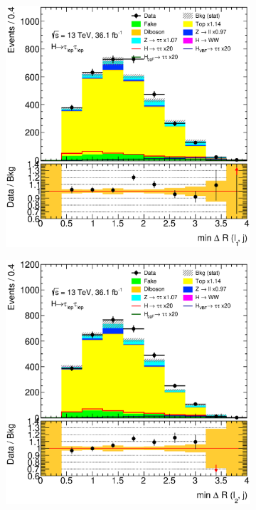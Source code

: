\begin{figure}[htb]
\begin{subfigure}[t]{0.3\textwidth}
    \end{subfigure}
    \begin{subfigure}[t]{0.3\textwidth}
        \includegraphics[width=\textwidth]{./plots/mva/modeling/input_vars/VBF_CR/ll-CutMVAVBFCatTopCR-dRminLep0Jet-lin.eps}
    \end{subfigure}
    \begin{subfigure}[t]{0.3\textwidth}
        \includegraphics[width=\textwidth]{./plots/mva/modeling/input_vars/VBF_CR/ll-CutMVAVBFCatTopCR-dRminLep1Jet-lin.eps}

\end{subfigure}
\end{figure}
